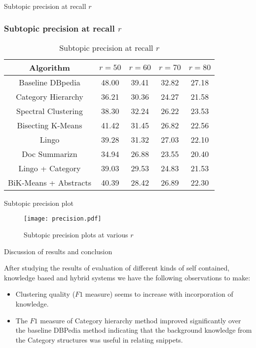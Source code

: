 \documentclass{beamer}
\begin{document}
\begin{frame}{Subtopic precision at recall $r$}
\subsubsection{Subtopic precision at recall $r$}

\begin{table}[h]
\centering
\begin{tabular} {|c | c | c | c|c|}
  \hline
  Algorithm & $r = 50$ & $r = 60$  & $r = 70$ & $r = 80$ \\
  \hline
  Baseline DBpedia & 48.00 & 39.41 & 32.82 & 27.18 \\
  Category Hierarchy & 36.21 & 30.36 & 24.27 & 21.58 \\
  Spectral Clustering & 38.30 & 32.24 & 26.22 & 23.53 \\
  \hline
  Bisecting K-Means & 41.42 & 31.45 & 26.82 & 22.56 \\
  Lingo & 39.28 & 31.32 & 27.03 & 22.10 \\
  Doc Summarizn & 34.94 & 26.88 & 23.55 & 20.40 \\
  \hline
  Lingo + Category & 39.03 & 29.53 & 24.83 & 21.53 \\
  BiK-Means + Abstracts & 40.39 & 28.42 & 26.89 & 22.30 \\
  \hline
\end{tabular}
\caption{Subtopic precision at recall $r$}
\end{table}
\end{frame}
\begin{frame}{Subtopic precision plot}
\begin{figure}[h]
  \centering
  \texttt{[image: precision.pdf]}
  \caption{Subtopic precision plots at various $r$}
  \label{fig:recall}
\end{figure}
\end{frame}

\begin{frame}[fragile]{Discussion of results and conclusion}

After studying the results of evaluation of different kinds of self
contained, knowledge based and hybrid systems we have the following
observations to make:
\begin{itemize}
  \item Clustering quality ($F1$ measure) seems to increase with
    incorporation of knowledge. 
  \item The $F1$ measure of Category hierarchy
    method improved significantly over the baseline DBPedia method
    indicating that the background knowledge from the Category
    structures was useful in relating snippets.
\end{itemize}
\end{frame}
\end{document}
